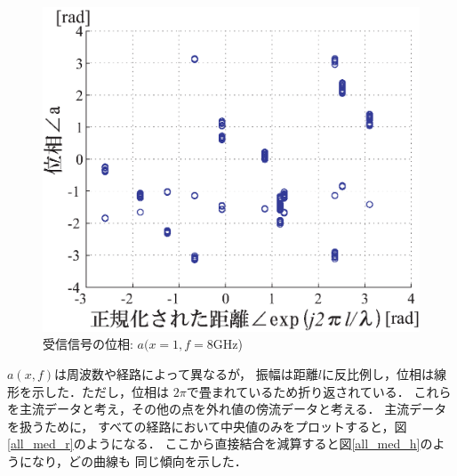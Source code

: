 ﻿\documentclass[12pt,oneside]{jsbook}
\begin{document}
\begin{figure}[t]
\begin{center}
\includegraphics[width =\hsize ]{scatter_A_phs.eps}
\caption{受信信号の位相: $a(x=1,f=8$GHz)}
\label{scat_A_p}
 \end{center}
\end{figure}

$a(x,f)$は周波数や経路によって異なるが，
振幅は距離$l$に反比例し，位相は線形を示した．ただし，位相は
$2\pi$で畳まれているため折り返されている．
これらを主流データと考え，その他の点を外れ値の傍流データと考える．
主流データを扱うために，
すべての経路において中央値のみをプロットすると，図\ref{all_med_r}のようになる．
ここから直接結合を減算すると図\ref{all_med_h}のようになり，どの曲線も
同じ傾向を示した．
\end{document}
